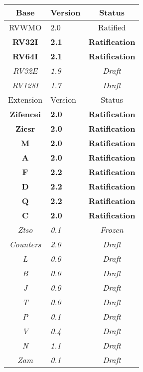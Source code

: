 {
\begin{table}[hbt]
  \centering
  \begin{tabular}{|c|l|c|}
    \hline
    Base           & Version & Status\\
    \hline
    RVWMO          & 2.0 & Ratified   \\
    \bf RV32I      & \bf 2.1 & \bf Ratification \\
    \bf RV64I      & \bf 2.1 & \bf Ratification \\
    \em RV32E      & \em 1.9 & \em Draft \\
    \em RV128I     & \em 1.7 & \em Draft \\
    \hline
    Extension      & Version & Status \\
    \hline
    \bf Zifencei   & \bf 2.0 & \bf Ratification \\
    \bf Zicsr      & \bf 2.0 & \bf Ratification \\
    \bf M          & \bf 2.0 & \bf Ratification \\
    \bf A          & \bf 2.0 & \bf Ratification \\
    \bf F          & \bf 2.2 & \bf Ratification \\
    \bf D          & \bf 2.2 & \bf Ratification \\
    \bf Q          & \bf 2.2 & \bf Ratification \\
    \bf C          & \bf 2.0 & \bf Ratification \\
    \em Ztso       & \em 0.1 & \em Frozen \\
    \em Counters   & \em 2.0 & \em Draft \\
    \em L          & \em 0.0 & \em Draft \\
    \em B          & \em 0.0 & \em Draft \\
    \em J          & \em 0.0 & \em Draft \\
    \em T          & \em 0.0 & \em Draft \\
    \em P          & \em 0.1 & \em Draft \\
    \em V          & \em 0.4 & \em Draft \\
    \em N          & \em 1.1 & \em Draft \\
    \em Zam        & \em 0.1 & \em Draft \\
    \hline
  \end{tabular}
\end{table}
}

